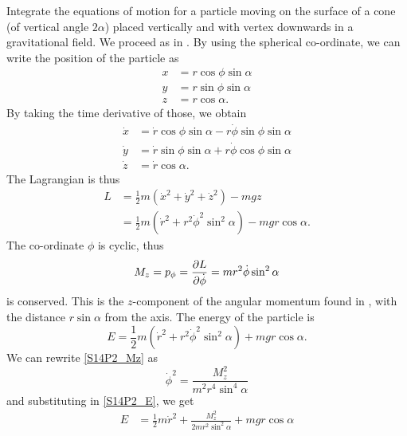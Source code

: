 
\begin{problem}[title={Particle on the surface of a vertical cone}]
{
Integrate the equations of motion for a particle moving on the surface of a cone (of vertical angle $2\alpha$) placed vertically and with vertex downwards in a gravitational field.
}
{
We proceed as in . By using the  spherical co-ordinate, we can write the position of the particle as
\begin{align*}
    x &= r\cos{\phi}\sin{\alpha} \\
    y &= r\sin{\phi}\sin{\alpha} \\
    z &= r\cos{\alpha}.
\end{align*}
By taking the time derivative of those, we obtain
\begin{align*}
    \Dot{x} &= \Dot{r}\cos{\phi}\sin{\alpha} - r\Dot{\phi}\sin{\phi}\sin{\alpha} \\
    \Dot{y} &= \Dot{r}\sin{\phi}\sin{\alpha} + r\Dot{\phi}\cos{\phi}\sin{\alpha} \\
    \Dot{z} &= \Dot{r}\cos{\alpha}.
\end{align*}
The Lagrangian is thus
\begin{align*}
    L &= \frac{1}{2}m\left( \Dot{x}^2 + \Dot{y}^2 + \Dot{z}^2 \right) - mgz \\
    &= \frac{1}{2}m\left( \Dot{r}^2 + r^2\Dot{\phi}^2\sin^2{\alpha} \right) -mgr\cos{\alpha} .
\end{align*}
The co-ordinate $\phi$ is cyclic, thus 
\begin{equation} \label{S14P2_Mz}
    M_z = p_{\phi} = \frac{\partial L}{\partial \Dot{\phi}} = mr^2\Dot{\phi}\sin^2{\alpha}
\end{equation}
is conserved. This is the $z$-component of the angular momentum found in , with the distance $r\sin{\alpha}$ from the axis. The energy of the particle is
\begin{equation} \label{S14P2_E}
    E = \frac{1}{2}m\left( \Dot{r}^2 + r^2\Dot{\phi}^2\sin^2{\alpha} \right) + mgr\cos{\alpha} .
\end{equation}
We can rewrite \eqref{S14P2_Mz} as
\begin{equation*}
    \Dot{\phi}^2 =  \frac{M_z^2}{m^2r^4\sin^4{\alpha}}
\end{equation*}
and substituting in \eqref{S14P2_E}, we get
\begin{align*}
    E &= \frac{1}{2}m\Dot{r}^2 + \frac{M_z^2}{2mr^2\sin^2{\alpha}} + mgr\cos{\alpha} \\

\end{align*}}
\end{problem}
